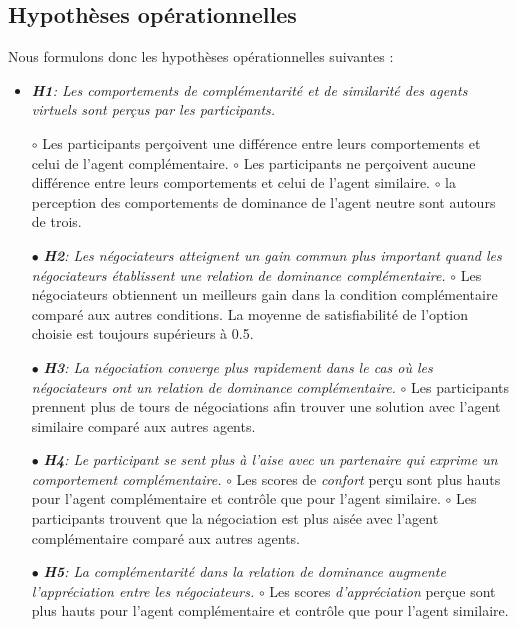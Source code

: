 	\subsection{Hypothèses opérationnelles}
	Nous formulons donc les hypothèses opérationnelles suivantes :
	\begin{itemize}
		\item\textit{\textbf{H1}: Les comportements de complémentarité et de similarité des agents virtuels sont perçus par les participants.}
		
		\subitem $\circ$  Les participants perçoivent une différence entre leurs comportements et celui de l'agent complémentaire.
		\subitem $\circ$ Les participants ne perçoivent aucune différence entre leurs comportements et celui de l'agent similaire.
		\subitem $\circ$ la perception des comportements de dominance de l'agent neutre sont autours de trois. 
		\item [$\bullet$]\textit{ \textbf{H2}: Les négociateurs atteignent un gain commun plus important quand les négociateurs établissent une relation de dominance complémentaire.}
		\subitem $\circ$ Les négociateurs obtiennent un meilleurs gain dans la condition complémentaire comparé aux autres conditions. La moyenne de satisfiabilité de l'option choisie est toujours supérieurs à 0.5. 
		
		\item [$\bullet$] \textit{\textbf{H3}: La négociation converge plus rapidement dans le cas où les négociateurs ont un relation de dominance complémentaire.}
		\subitem $\circ$ Les participants prennent plus de tours de négociations afin trouver une solution avec l'agent similaire comparé aux autres agents.
		
		
		\item [$\bullet$] \textit{\textbf{H4}: Le participant se sent plus à l'aise avec un partenaire qui exprime un comportement complémentaire.}
		\subitem $\circ$ Les scores de \emph{confort} perçu sont plus hauts pour l'agent complémentaire et contrôle que pour l'agent similaire.
		\subitem $\circ$ Les participants trouvent que la négociation est plus aisée avec l'agent complémentaire comparé aux autres agents.
		\item [$\bullet$] \textit{\textbf{H5}: La complémentarité dans la relation de dominance augmente l'appréciation entre les négociateurs.}
		\subitem $\circ$ Les scores \emph{d'appréciation} perçue sont plus hauts pour l'agent complémentaire et contrôle que pour l'agent similaire.
		
	\end{itemize}
	
